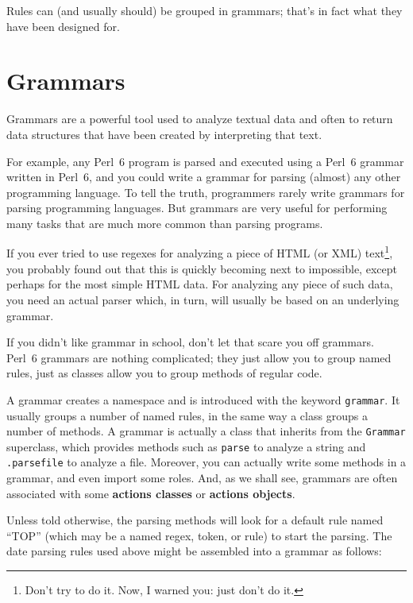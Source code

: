 Rules can (and usually should) be grouped in 
grammars; that's in fact what they have been designed 
for.

\section{Grammars}

Grammars are a powerful tool used to analyze textual data 
and often to return data structures that have been 
created by interpreting that text.

For example, any Perl~6 program is parsed and executed 
using a Perl~6 grammar written in Perl~6, and you could write a grammar 
for parsing (almost) any other programming language. 
To tell the truth, programmers rarely 
write grammars for parsing programming languages. But 
grammars are very useful for performing many tasks 
that are much more common than parsing programs.


If you ever tried to use regexes for analyzing a piece 
of HTML (or XML) text\footnote{Don't try to do it. Now, 
I warned you: just don't do it.}, you 
probably found out that this is quickly becoming next 
to impossible, except perhaps for the most simple 
HTML data. For analyzing any piece of such data, you 
need an actual parser which, in turn, will usually be 
based on an underlying grammar.

If you didn't like grammar in school, don't let that 
scare you off grammars. Perl~6 grammars are nothing complicated; 
they just allow you to group named rules, just as classes 
allow you to group methods of regular code.

A grammar creates a namespace and is introduced with the 
keyword {\tt grammar}. It usually groups a number of 
named rules, in the same way a class groups 
a number of methods. A grammar is actually a class that 
inherits from the {\tt Grammar} superclass, which provides 
methods such as {\tt parse} to analyze a string and 
{\tt .parsefile} to analyze a file. Moreover, you can 
actually write some methods in a grammar, and even import 
some roles. And, as we shall see, grammars are often 
associated with some {\bf actions classes} or 
{\bf actions objects}.

Unless told otherwise, the parsing methods will look for 
a default rule named ``TOP'' (which may be a named regex, 
token, or rule) to start the parsing. The date parsing rules 
used above might be assembled into a grammar as follows:

